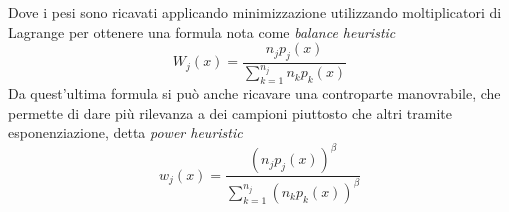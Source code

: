Dove i pesi sono ricavati applicando minimizzazione utilizzando moltiplicatori di Lagrange \cite{pegoraro} per ottenere una formula nota come 
\textit{balance heuristic}
\begin{equation}
	W_j(x)=\frac{n_jp_j(x)}{\sum_{k=1}^{n_j}n_kp_k(x)}
\end{equation}
Da quest'ultima formula si pu\`o anche ricavare una controparte manovrabile, che permette di dare pi\`u rilevanza a dei campioni piuttosto che altri 
tramite esponenziazione, detta \textit{power heuristic}
\begin{equation}
	w_j(x)=\frac{\left(n_jp_j(x)\right)^\beta}{\sum_{k=1}^{n_j}\left(n_kp_k(x)\right)^\beta}
\end{equation}
